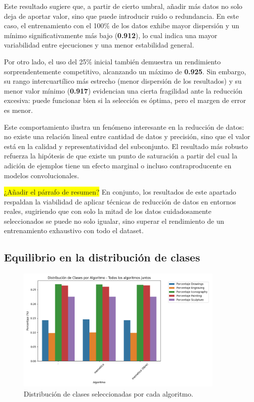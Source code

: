 Este resultado sugiere que, a partir de cierto umbral, añadir más datos no solo deja de aportar valor, sino que puede introducir ruido o redundancia.
En este caso, el entrenamiento con el 100\% de los datos exhibe mayor dispersión y un mínimo significativamente más bajo (\textbf{0.912}),
lo cual indica una mayor variabilidad entre ejecuciones y una menor estabilidad general.

Por otro lado, el uso del 25\% inicial también demuestra un rendimiento sorprendentemente competitivo,
alcanzando un máximo de \textbf{0.925}.
Sin embargo, su rango intercuartílico más estrecho (menor dispersión de los resultados) y su menor valor mínimo 
(\textbf{0.917}) evidencian una cierta fragilidad ante la reducción excesiva:
puede funcionar bien si la selección es óptima, pero el margen de error es menor.

Este comportamiento ilustra un fenómeno interesante en la reducción de datos: no existe una relación lineal entre cantidad de datos y precisión,
sino que el valor está en la calidad y representatividad del subconjunto.
El resultado más robusto refuerza la hipótesis de que existe un punto de saturación
a partir del cual la adición de ejemplos tiene un efecto marginal o incluso contraproducente en modelos convolucionales.

\colorbox{yellow}{¿Añadir el párrafo de resumen?}
En conjunto, los resultados de este apartado respaldan la viabilidad de aplicar técnicas de reducción de datos en entornos reales,
sugiriendo que con solo la mitad de los datos cuidadosamente seleccionados se puede no solo igualar,
sino superar el rendimiento de un entrenamiento exhaustivo con todo el dataset.

\subsection{Equilibrio en la distribución de clases}
\begin{figure}[h]
    \centering
    \includegraphics[width=0.9\textwidth]{imagenes/evaluaciones/painting/balance-de-clases-por-algoritmo}
    \caption{Distribución de clases seleccionadas por cada algoritmo.}
    \label{fig:balance_clases_painting}
\end{figure}

